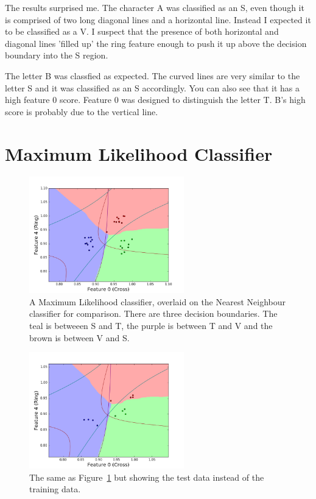 \documentclass[11pt, a4paper]{article}
\begin{document}
The results surprised me. The character A was classified as an S, even though it is comprised of two long diagonal lines and a horizontal line. Instead I expected it to be classified as a V. I suspect that the presence of both horizontal and diagonal lines 'filled up' the ring feature enough to push it up above the decision boundary into the S region. 

The letter B was classfied as expected. The curved lines are very similar to the letter S and it was classified as an S accordingly. You can also see that it has a high feature 0 score. Feature 0 was designed to distinguish the letter T. B's high score is probably due to the vertical line. 

\section{Maximum Likelihood Classifier}
\begin{figure}[ht]
	\centering
	\includegraphics[trim={0 0 0 1cm},clip,width=0.6\textwidth]{max_likelihood.png}
	\caption{A Maximum Likelihood classifier, overlaid on the Nearest Neighbour classifier for comparison. There are three decision boundaries. The teal is betweeen S and T, the purple is between T and V and the brown is between V and S.}
	\label{fig:ml}
\end{figure}

\begin{figure}[ht]
	\centering
	\includegraphics[trim={0 0 0 1cm},clip,width=0.6\textwidth]{max_likelihood_test.png}
	\caption{The same as Figure~\ref{fig:ml} but showing the test data instead of the training data.}
	\label{fig:ml_test}
\end{figure}
\end{document}
